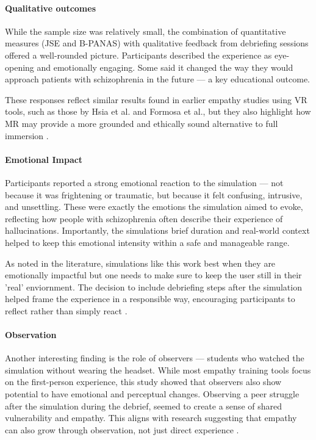 \paragraph{Qualitative outcomes}
While the sample size was relatively small, the combination of quantitative measures (JSE and B-PANAS) with qualitative feedback from debriefing sessions offered a well-rounded picture. Participants described the experience as eye-opening and emotionally engaging. Some said it changed the way they would approach patients with schizophrenia in the future — a key educational outcome.

\vspace{1em}

These responses reflect similar results found in earlier empathy studies using VR tools, such as those by Hsia et al. and Formosa et al., but they also highlight how MR may provide a more grounded and ethically sound alternative to full immersion \cite{Hsia2022, Formosa2018}.

\paragraph{Emotional Impact}

Participants reported a strong emotional reaction to the simulation — not because it was frightening or traumatic, but because it felt confusing, intrusive, and unsettling. These were exactly the emotions the simulation aimed to evoke, reflecting how people with schizophrenia often describe their experience of hallucinations. Importantly, the simulations brief duration and real-world context helped to keep this emotional intensity within a safe and manageable range.

\vspace{1em}

As noted in the literature, simulations like this work best when they are emotionally impactful but one needs to make sure to keep the user still in their 'real' enviornment. The decision to include debriefing steps after the simulation helped frame the experience in a responsible way, encouraging participants to reflect rather than simply react \cite{Rueda2020, Ando2011}.

\paragraph{Observation}

Another interesting finding is the role of observers — students who watched the simulation without wearing the headset. While most empathy training tools focus on the first-person experience, this study showed that observers also show potential to have  emotional and perceptual changes. Observing a peer struggle after the simulation during the debrief, seemed to create a sense of shared vulnerability and empathy. This aligns with research suggesting that empathy can also grow through observation, not just direct experience \cite{Formosa2018}.
\vspace{1em}

